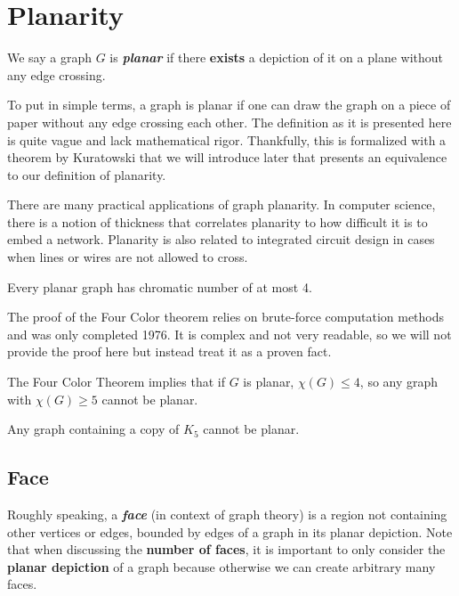 \section{Planarity}

\begin{definition}[Planarity]
    We say a graph $G$ is \textit{\textbf{planar}} if there \textbf{exists} a depiction of it on a plane without any edge crossing.
\end{definition}

To put in simple terms, a graph is planar if one can draw the graph on a piece of paper without any edge crossing each other. The definition as it is presented here is quite vague and lack mathematical rigor. Thankfully, this is formalized with a theorem by Kuratowski that we will introduce later that presents an equivalence to our definition of planarity.

There are many practical applications of graph planarity. In computer science, there is a notion of thickness that correlates planarity to how difficult it is to embed a network. Planarity is also related to integrated circuit design in cases when lines or wires are not allowed to cross.

\begin{theorem}
    Every planar graph has chromatic number of at most 4.
\end{theorem}

The proof of the Four Color theorem relies on brute-force computation methods and was only completed 1976. It is complex and not very readable, so we will not provide the proof here but instead treat it as a proven fact.

The Four Color Theorem implies that if $G$ is planar, $\chi(G) \leq 4$, so any graph with $\chi(G) \geq 5$ cannot be planar.

\begin{corollary}
    Any graph containing a copy of $K_5$ cannot be planar.
\end{corollary}

\subsection{Face}

Roughly speaking, a \textit{\textbf{face}} (in context of graph theory) is a region not containing other vertices or edges, bounded by edges of a graph in its planar depiction. Note that when discussing the \textbf{number of faces}, it is important to only consider the \textbf{planar depiction} of a graph because otherwise we can create arbitrary many faces.

